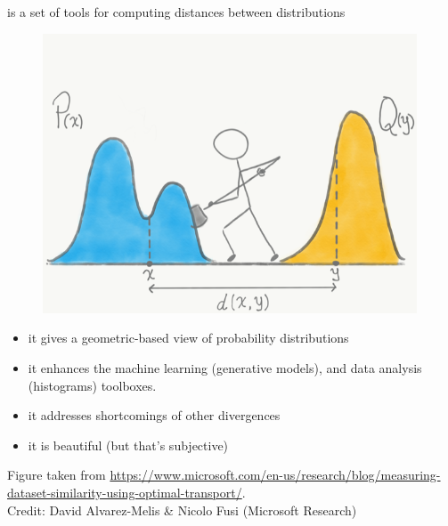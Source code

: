 \documentclass[pdf,aspectratio=169,10pt]{beamer}
\begin{document}
\begin{frame}{
}
 is a set of tools for computing distances between distributions
\vspace{1em}

\begin{minipage}{0.5\textwidth}
\begin{figure}
  \includegraphics[width=0.99\textwidth]{../img/OT_shovel}
\end{figure}    
\end{minipage}
\hfill
\begin{minipage}{0.45\textwidth}
\begin{itemize}
    \item it gives a geometric-based view of probability distributions 
    \item it enhances the machine learning (generative models), and data analysis (histograms) toolboxes.
    \item it addresses shortcomings of other divergences
    \item it is beautiful (but that's subjective)
\end{itemize}
\end{minipage}
\vfill

\tiny{Figure taken from \url{https://www.microsoft.com/en-us/research/blog/measuring-dataset-similarity-using-optimal-transport/}. \\Credit: David Alvarez-Melis \&  Nicolo Fusi (Microsoft Research)}

\end{frame}
\end{document}
